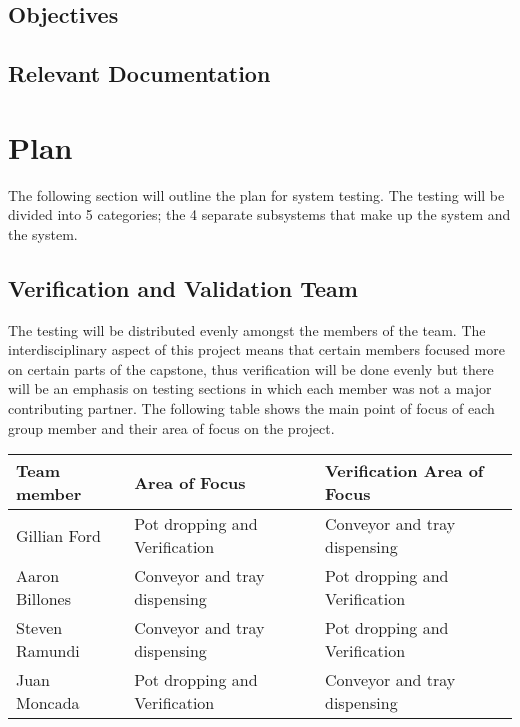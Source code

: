 \documentclass[12pt, titlepage]{article}
\begin{document}

\subsection{Objectives}


\subsection{Relevant Documentation}


\citet{SRS}

\section{Plan}
The following section will outline the plan for system testing. The testing 
will be divided into 5 categories; the 4 separate subsystems that make up the system and the system.

\subsection{Verification and Validation Team}

The testing will be distributed evenly amongst the members of the team. The interdisciplinary aspect of this 
project means that certain members focused more on certain parts of the capstone, thus verification will be 
done evenly but there will be an emphasis on testing sections in which each member was not a major contributing partner.
The following table shows the main point of focus of each group member and their area of focus on the project.
\begin{center}
  \begin{tabular}{ |l|l|l| } 
    \hline
    \textbf{Team member} & \textbf{Area of Focus } & \textbf{Verification Area of Focus} \\ 
    \hline
    Gillian Ford   & Pot dropping and Verification & Conveyor and tray dispensing \\
    Aaron Billones & Conveyor and tray dispensing & Pot dropping and Verification \\
    Steven Ramundi & Conveyor and tray dispensing & Pot dropping and Verification \\
    Juan Moncada   & Pot dropping and Verification & Conveyor and tray dispensing\\
    \hline
  \end{tabular}
\end{center}
\end{document}
